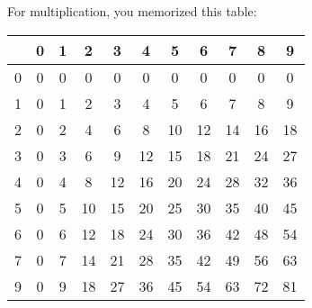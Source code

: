 For multiplication, you memorized this table:

\begin{tabular}{ c || c | c | c | c | c | c| c| c| c| c}
  & 0 & 1 & 2 & 3 & 4 & 5 & 6 & 7 & 8 & 9 \\
  \hline
  0  & 0  & 0  & 0  & 0  & 0  & 0  & 0  & 0  & 0  &  0 \\
  1  & 0  & 1  & 2  & 3  & 4  & 5  & 6  & 7  & 8  &  9 \\
  2  & 0  & 2  & 4  & 6  & 8  & 10 & 12 & 14 & 16 & 18 \\
  3  & 0  & 3  & 6  & 9  & 12 & 15 & 18 & 21 & 24 & 27 \\
  4  & 0  & 4  & 8  & 12 & 16 & 20 & 24 & 28 & 32 & 36 \\
  5  & 0  & 5  & 10 & 15 & 20 & 25 & 30 & 35 & 40 & 45 \\
  6  & 0  & 6  & 12 & 18 & 24 & 30 & 36 & 42 & 48 & 54 \\
  7  & 0  & 7  & 14 & 21 & 28 & 35 & 42 & 49 & 56 & 63 \\
  9  & 0  & 9  & 18 & 27 & 36 & 45 & 54 & 63 & 72 & 81 
  \end{tabular}

